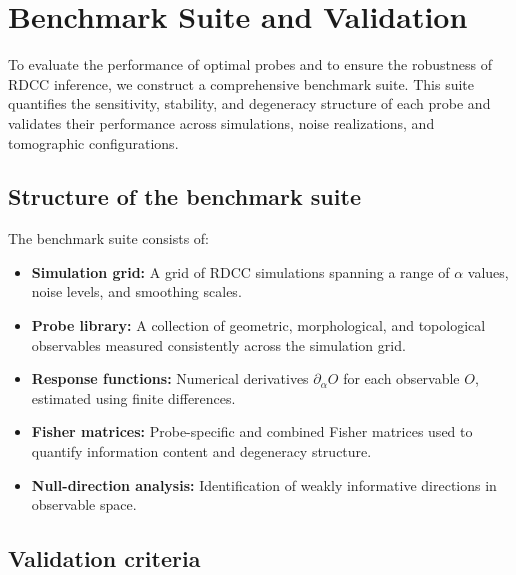 \documentclass[11pt,a4paper]{article}
\begin{document}
\section{Benchmark Suite and Validation}

To evaluate the performance of optimal probes and to ensure the robustness of 
RDCC inference, we construct a comprehensive benchmark suite. This suite 
quantifies the sensitivity, stability, and degeneracy structure of each probe 
and validates their performance across simulations, noise realizations, and 
tomographic configurations.

\subsection{Structure of the benchmark suite}

The benchmark suite consists of:
\begin{itemize}
    \item \textbf{Simulation grid:}  
    A grid of RDCC simulations spanning a range of $\alpha$ values, noise 
    levels, and smoothing scales.

    \item \textbf{Probe library:}  
    A collection of geometric, morphological, and topological observables 
    measured consistently across the simulation grid.

    \item \textbf{Response functions:}  
    Numerical derivatives $\partial_\alpha O$ for each observable $O$, 
    estimated using finite differences.

    \item \textbf{Fisher matrices:}  
    Probe-specific and combined Fisher matrices used to quantify information 
    content and degeneracy structure.

    \item \textbf{Null-direction analysis:}  
    Identification of weakly informative directions in observable space.
\end{itemize}

\subsection{Validation criteria}
\end{document}
